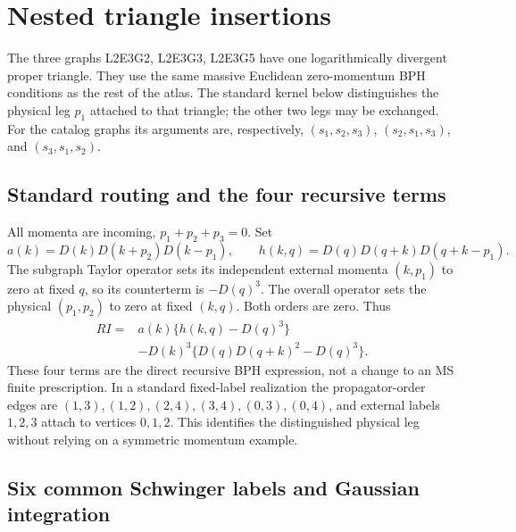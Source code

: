 \section{Nested triangle insertions}
\label{sec:nested-triangle}

The three graphs L2E3G2, L2E3G3, L2E3G5 have one logarithmically divergent
proper triangle. They use the same massive Euclidean zero-momentum BPH
conditions as the rest of the atlas. The standard kernel below distinguishes
the physical leg $p_1$ attached to that triangle; the other two legs may be
exchanged. For the catalog graphs its arguments are, respectively,
$(s_1,s_2,s_3)$, $(s_2,s_1,s_3)$, and $(s_3,s_1,s_2)$.

\subsection{Standard routing and the four recursive terms}

All momenta are incoming, $p_1+p_2+p_3=0$. Set
\[
 a(k)=D(k)D(k+p_2)D(k-p_1),\qquad
 h(k,q)=D(q)D(q+k)D(q+k-p_1).
\]
The subgraph Taylor operator sets its independent external momenta
$(k,p_1)$ to zero at fixed $q$, so its counterterm is $-D(q)^3$.
The overall operator sets the physical $(p_1,p_2)$ to zero at fixed
$(k,q)$. Both orders are zero. Thus
\begin{align*}
 RI={}&a(k)\{h(k,q)-D(q)^3\}\\
 &-D(k)^3\{D(q)D(q+k)^2-D(q)^3\}.
\end{align*}
These four terms are the direct recursive BPH expression, not a change to
an MS finite prescription. In a standard fixed-label realization the
propagator-order edges are
$(1,3),(1,2),(2,4),(3,4),(0,3),(0,4)$, and external labels $1,2,3$ attach
to vertices $0,1,2$. This identifies the distinguished physical leg without
relying on a symmetric momentum example.

\subsection{Six common Schwinger labels and Gaussian integration}

